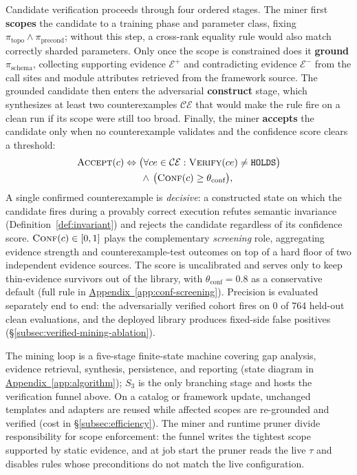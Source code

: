 \documentclass[sigconf,nonacm]{acmart}
\newcommand{\suppappendix}[1]{%
  \href{https://github.com/vivia-an/trainaudit-vldb-artifact/blob/vldb-2027-artifact-v1.0.1/paper/appendix_supplement.pdf}%
  {Appendix~\ref*{#1}}}
\begin{document}
\label{subsubsec:candidate-verification}
Candidate verification proceeds through four ordered stages. The miner first
\textbf{scopes} the candidate to a training phase and parameter class, fixing
$\pi_{\text{topo}} \wedge \pi_{\text{precond}}$; without this step, a
cross-rank equality rule would also match correctly sharded parameters. Only
once the scope is constrained does it \textbf{ground} $\pi_{\text{schema}}$,
collecting supporting evidence $\mathcal{E}^{+}$ and contradicting evidence
$\mathcal{E}^{-}$ from the call sites and module attributes retrieved from the
framework source. The grounded candidate then enters the adversarial
\textbf{construct} stage, which synthesizes at least two counterexamples
$\mathcal{CE}$ that would make the rule fire on a clean run if its scope were
still too broad. Finally, the miner \textbf{accepts} the candidate only when no
counterexample validates and the confidence score clears a threshold:
\begin{equation}
\begin{aligned}
\textsc{Accept}(c) \Leftrightarrow\; & \big(\forall ce \in \mathcal{CE}: \textsc{Verify}(ce) \neq \texttt{HOLDS}\big) \\
& \,\land\, \big(\textsc{Conf}(c) \geq \theta_{\text{conf}}\big),
\end{aligned}
\label{eq:accept}
\end{equation}
A single confirmed counterexample is \emph{decisive}: a constructed state on
which the candidate fires during a provably correct execution refutes semantic
invariance (Definition~\ref{def:invariant}) and rejects the candidate regardless
of its confidence score. $\textsc{Conf}(c) \in [0,1]$ plays the complementary
\emph{screening} role, aggregating evidence strength and counterexample-test
outcomes on top of a hard floor of two independent evidence sources. The score
is uncalibrated and serves only to keep thin-evidence survivors out of the
library, with $\theta_{\text{conf}}{=}0.8$ as a conservative default (full rule
in \suppappendix{app:conf-screening}). Precision is evaluated separately end to
end: the adversarially verified cohort fires on 0 of 764 held-out clean
evaluations, and the deployed library produces \FixedFPFrac{} fixed-side false
positives (\S\ref{subsec:verified-mining-ablation}).

The mining loop is a five-stage finite-state machine covering gap analysis,
evidence retrieval, synthesis, persistence, and reporting (state diagram in
\suppappendix{app:algorithm}); $S_3$ is the only branching stage and hosts the
verification funnel above. On a catalog or framework update, unchanged
templates and adapters are reused while affected scopes are re-grounded and
verified (cost in \S\ref{subsec:efficiency}). The miner and runtime pruner divide
responsibility for scope enforcement: the funnel writes the tightest scope
supported by static evidence, and at job start the pruner reads the live $\tau$
and disables rules whose preconditions do not match the live configuration.
\end{document}
